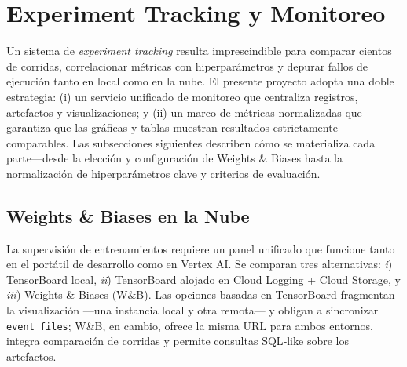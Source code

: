 \section{Experiment Tracking y Monitoreo}\label{sec:tracking}

Un sistema de \textit{experiment tracking} resulta imprescindible para comparar cientos de corridas, correlacionar métricas con hiperparámetros y depurar fallos de ejecución tanto en local como en la nube.
El presente proyecto adopta una doble estrategia: (i) un servicio unificado de monitoreo que centraliza registros, artefactos y visualizaciones; y (ii) un marco de métricas normalizadas que garantiza que las gráficas y tablas muestran resultados estrictamente comparables.
Las subsecciones siguientes describen cómo se materializa cada parte—desde la elección y configuración de Weights \& Biases hasta la normalización de hiperparámetros clave y criterios de evaluación.

\subsection{Weights \& Biases en la Nube}\label{ssec:wandb}

La supervisión de entrenamientos requiere un panel unificado que funcione tanto en el portátil de desarrollo como en Vertex AI.
Se comparan tres alternativas:
\textit{i}) TensorBoard local,
\textit{ii}) TensorBoard alojado en Cloud Logging + Cloud Storage, y
\textit{iii}) Weights \& Biases (W\&B).
Las opciones basadas en TensorBoard fragmentan la visualización —una instancia local y otra remota— y obligan a sincronizar \texttt{event\_files}; W\&B, en cambio, ofrece la misma URL para ambos entornos, integra comparación de corridas y permite consultas SQL‐like sobre los artefactos.


